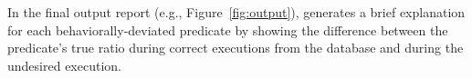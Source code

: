 In the final output report (e.g., Figure~\ref{fig:output}), \ourtool 
generates a brief explanation for each behaviorally-deviated predicate
by showing the difference between the predicate's true ratio during
correct executions from the database and during the undesired execution.





